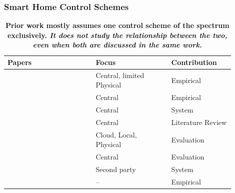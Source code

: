 \subsubsection{Smart Home Control Schemes}

\begin{table}
    \caption{\bf \small Prior work mostly assumes one control scheme of the spectrum exclusively. {\it It does not study the relationship between the two, even when both are discussed in the same work.}}
    \bigskip
    \label{cic:tab:related_work}
    \small
    \renewcommand{\arraystretch}{1}
    \begin{tabular}{p{0.35\linewidth}p{0.3\linewidth}p{0.25\linewidth}}
        \hline
        \textbf{Papers} &  \textbf{Focus} & \textbf{Contribution}\\
         \hline
         \hline
         \cite{geeng2019s,wozniak2023inhabiting} & Central, limited Physical & Empirical \\
         \hline
         \cite{fakhrhosseini2024taxonomy,HomeOS} & Central & Empirical \\
         \hline
         \cite{Safehome,alshehri2016access,anthi2018eclipseiot,basu2020trustless,vrSmartHome,DepSys,raj2018voice,Beam,TaskCruncher,SemanticStream} & Central & System \\
         \hline
         \cite{gunge2016smart,zavalyshyn2022sok} & Central & Literature Review \\
         \hline
         \cite{apthorpe2018keeping} & Cloud, Local, Physical & Evaluation \\
         \hline
         \cite{ur2014practical} & Central & Evaluation \\
         \hline
         \cite{acar2020peek,oconnor2019homesnitch} & Second party & System \\
         \hline
         \cite{enduser} & -- & Empirical \\
         \hline
    \end{tabular}
\end{table}

